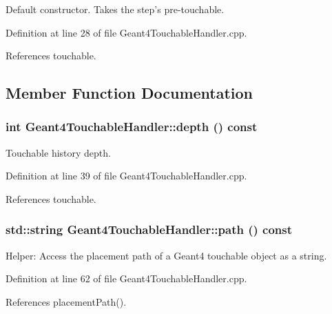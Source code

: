 Default constructor. Takes the step's pre-\/touchable. 

Definition at line 28 of file Geant4TouchableHandler.cpp.

References touchable.

\subsection{Member Function Documentation}
\hypertarget{class_d_d4hep_1_1_simulation_1_1_geant4_touchable_handler_ab82d307aaa98dfd0f5c775c8f99d90ea}{
\subsubsection[{depth}]{\setlength{\rightskip}{0pt plus 5cm}int Geant4TouchableHandler::depth () const}}
\label{class_d_d4hep_1_1_simulation_1_1_geant4_touchable_handler_ab82d307aaa98dfd0f5c775c8f99d90ea}


Touchable history depth. 

Definition at line 39 of file Geant4TouchableHandler.cpp.

References touchable.\hypertarget{class_d_d4hep_1_1_simulation_1_1_geant4_touchable_handler_a2cc01ed8301f7f2df0cd9e5f5b6142ea}{
\subsubsection[{path}]{\setlength{\rightskip}{0pt plus 5cm}std::string Geant4TouchableHandler::path () const}}
\label{class_d_d4hep_1_1_simulation_1_1_geant4_touchable_handler_a2cc01ed8301f7f2df0cd9e5f5b6142ea}


Helper: Access the placement path of a Geant4 touchable object as a string. 

Definition at line 62 of file Geant4TouchableHandler.cpp.

References placementPath().

